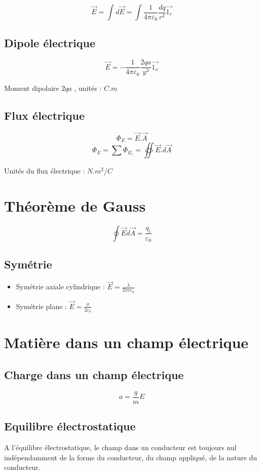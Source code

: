 \documentclass[a4paper,10pt,openright,titlepage]{report}
\begin{document}
$$\vec E = \int d{\vec E} = \int \frac{1}{4 \pi \varepsilon_0} \frac{dq}{r^2} \vec {1_r}$$

\subsection{Dipole électrique}

$$\vec E = - \frac{1}{4 \pi \varepsilon_0} \frac{2 q a}{y^3} \vec {1_x}$$

Moment dipolaire $2qa$ , unités : $C.m$

\subsection{Flux électrique}

$$\Phi_E = \vec {E}.\vec A$$
$$\Phi_E = \sum \Phi_{E_i} = \oiint \vec E.d \vec A$$

Unités du flux électrique : $N.m^2 / C$

\section{Théorème de Gauss}

$$\oint \vec E d \vec A = \frac{q_i}{\varepsilon_0}$$

\subsection{Symétrie}

\begin{itemize}
\item{Symétrie axiale cylindrique : $\vec E = \frac{\lambda}{2 \pi r \varepsilon_0}$}
\item{Symétrie plane : $\vec E = \frac{\sigma}{2 \varepsilon_0}$}
\end{itemize}


\section{Matière dans un champ électrique}
\subsection{Charge dans un champ électrique}
$$a = \frac{q}{m} E$$
\subsection{Equilibre électrostatique}
A l'équilibre électrostatique, le champ dans un conducteur est toujours nul indépendamment de la forme du conducteur, du champ appliqué, de la nature du conducteur.
\end{document}
